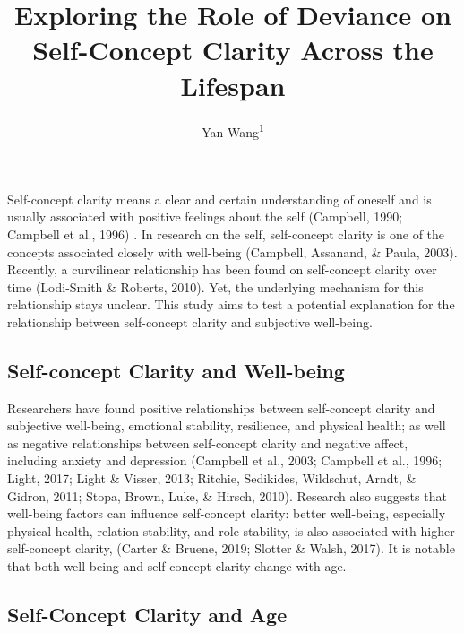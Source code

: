 \documentclass[
  man,floatsintext]{apa6}
\title{Exploring the Role of Deviance on Self-Concept Clarity Across the Lifespan}
\author{Yan Wang\textsuperscript{1}}
\date{}
\affiliation{\vspace{0.5cm}\textsuperscript{1} University of Chicago}
\begin{document}
\maketitle

Self-concept clarity means a clear and certain understanding of oneself and is usually associated with positive feelings about the self (Campbell, 1990; Campbell et al., 1996) . In research on the self, self-concept clarity is one of the concepts associated closely with well-being (Campbell, Assanand, \& Paula, 2003). Recently, a curvilinear relationship has been found on self-concept clarity over time (Lodi-Smith \& Roberts, 2010). Yet, the underlying mechanism for this relationship stays unclear. This study aims to test a potential explanation for the relationship between self-concept clarity and subjective well-being.

\hypertarget{self-concept-clarity-and-well-being}{%
\subsection{Self-concept Clarity and Well-being}\label{self-concept-clarity-and-well-being}}

Researchers have found positive relationships between self-concept clarity and subjective well-being, emotional stability, resilience, and physical health; as well as negative relationships between self-concept clarity and negative affect, including anxiety and depression (Campbell et al., 2003; Campbell et al., 1996; Light, 2017; Light \& Visser, 2013; Ritchie, Sedikides, Wildschut, Arndt, \& Gidron, 2011; Stopa, Brown, Luke, \& Hirsch, 2010). Research also suggests that well-being factors can influence self-concept clarity: better well-being, especially physical health, relation stability, and role stability, is also associated with higher self-concept clarity, (Carter \& Bruene, 2019; Slotter \& Walsh, 2017). It is notable that both well-being and self-concept clarity change with age.

\hypertarget{self-concept-clarity-and-age}{%
\subsection{Self-Concept Clarity and Age}\label{self-concept-clarity-and-age}}
\end{document}
